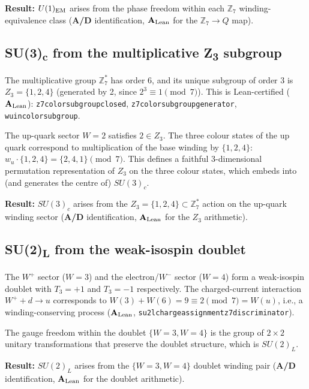 \documentclass[11pt]{article}
\theoremstyle{remark}
\newcommand{\lean}[1]{%
  \penalty-100
  \begingroup\def\_{\textunderscore\allowbreak}\texttt{#1}\endgroup}
\newcommand{\CatAL}{\ensuremath{\textbf{A}_{\rm Lean}}}
\newcommand{\CatAD}{\textbf{A/D}}
\begin{document}
\textbf{Result:} $U(1)_{\rm EM}$ arises from the phase freedom within
each $\mathbb{Z}_7$ winding-equivalence class (\CatAD{} identification,
\CatAL{} for the $\mathbb{Z}_7 \to Q$ map).

\subsection{SU(3)\textsubscript{c} from the multiplicative Z\textsubscript{3}
            subgroup}
\label{ssec:su3}

The multiplicative group $\mathbb{Z}_7^*$ has order 6, and its
unique subgroup of order 3 is $Z_3 = \{1,2,4\}$ (generated by 2,
since $2^3 \equiv 1 \pmod{7}$).
This is Lean-certified (\CatAL{}):
\lean{z7\_color\_subgroup\_closed}, \lean{z7\_color\_subgroup\_generator},
\lean{w\_u\_in\_color\_subgroup}.

The up-quark sector $W=2$ satisfies $2 \in Z_3$.
The three colour states of the up quark correspond to multiplication
of the base winding by $\{1,2,4\}$:
$w_u \cdot \{1,2,4\} = \{2,4,1\} \pmod{7}$.
This defines a faithful 3-dimensional permutation representation of $Z_3$
on the three colour states, which embeds into (and generates the centre
of) $SU(3)_c$.

\textbf{Result:} $SU(3)_c$ arises from the $Z_3 = \{1,2,4\} \subset
\mathbb{Z}_7^*$ action on the up-quark winding sector (\CatAD{}
identification, \CatAL{} for the $Z_3$ arithmetic).

\subsection{SU(2)\textsubscript{L} from the weak-isospin doublet}
\label{ssec:su2}

The $W^+$ sector ($W=3$) and the electron/$W^-$ sector ($W=4$) form
a weak-isospin doublet with $T_3 = +1$ and $T_3 = -1$ respectively.
The charged-current interaction $W^+ + d \to u$ corresponds to
$W(3) + W(6) = 9 \equiv 2 \pmod{7} = W(u)$, i.e., a winding-conserving
process (\CatAL{}, \lean{su2l\_charge\_assignment\_z7\_discriminator}).

The gauge freedom within the doublet $\{W=3, W=4\}$ is the group of
$2\times 2$ unitary transformations that preserve the doublet structure,
which is $SU(2)_L$.

\textbf{Result:} $SU(2)_L$ arises from the $\{W=3, W=4\}$ doublet
winding pair (\CatAD{} identification, \CatAL{} for the doublet
arithmetic).
\end{document}
